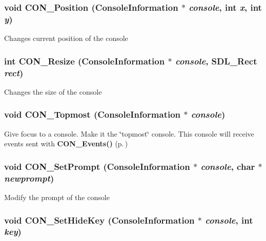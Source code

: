 \subsubsection{\setlength{\rightskip}{0pt plus 5cm}void CON\_\-Position ({\bf Console\-Information} $\ast$ {\em console}, int {\em x}, int {\em y})}\label{CON__console_8h_a22}


Changes current position of the console 
\subsubsection{\setlength{\rightskip}{0pt plus 5cm}int CON\_\-Resize ({\bf Console\-Information} $\ast$ {\em console}, SDL\_\-Rect {\em rect})}\label{CON__console_8h_a23}


Changes the size of the console 
\subsubsection{\setlength{\rightskip}{0pt plus 5cm}void CON\_\-Topmost ({\bf Console\-Information} $\ast$ {\em console})}\label{CON__console_8h_a24}


Give focus to a console. Make it the \char`\"{}topmost\char`\"{} console. This console will receive events sent with {\bf CON\_\-Events()} {\rm (p.\,\pageref{CON__console_8h_a10})} 
\subsubsection{\setlength{\rightskip}{0pt plus 5cm}void CON\_\-Set\-Prompt ({\bf Console\-Information} $\ast$ {\em console}, char $\ast$ {\em newprompt})}\label{CON__console_8h_a25}


Modify the prompt of the console 
\subsubsection{\setlength{\rightskip}{0pt plus 5cm}void CON\_\-Set\-Hide\-Key ({\bf Console\-Information} $\ast$ {\em console}, int {\em key})}\label{CON__console_8h_a26}


